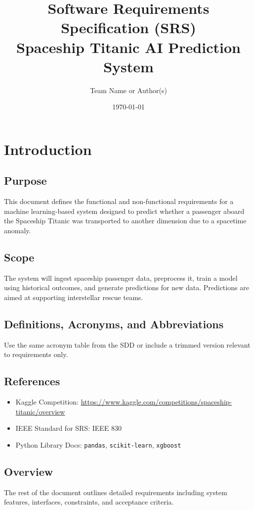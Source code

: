 \documentclass[15pt]{article}
\title{Software Requirements Specification (SRS)\\\large Spaceship Titanic AI Prediction System}
\author{Team Name or Author(s)}
\date{\today}
\begin{document}
\maketitle
\tableofcontents
\newpage

\section{Introduction}
\subsection{Purpose}
This document defines the functional and non-functional requirements for a machine learning-based system designed to predict whether a passenger aboard the Spaceship Titanic was transported to another dimension due to a spacetime anomaly.

\subsection{Scope}
The system will ingest spaceship passenger data, preprocess it, train a model using historical outcomes, and generate predictions for new data. Predictions are aimed at supporting interstellar rescue teams.

\subsection{Definitions, Acronyms, and Abbreviations}
Use the same acronym table from the SDD or include a trimmed version relevant to requirements only.

\subsection{References}
\begin{itemize}
    \item Kaggle Competition: \url{https://www.kaggle.com/competitions/spaceship-titanic/overview}
    \item IEEE Standard for SRS: IEEE 830
    \item Python Library Docs: \texttt{pandas}, \texttt{scikit-learn}, \texttt{xgboost}
\end{itemize}

\subsection{Overview}
The rest of the document outlines detailed requirements including system features, interfaces, constraints, and acceptance criteria.
\end{document}
